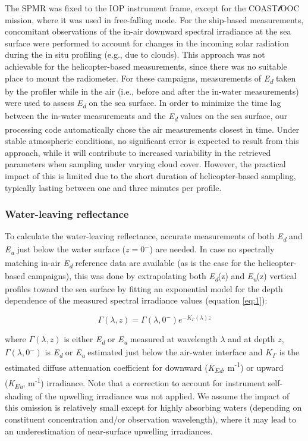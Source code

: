 \documentclass[essd, manuscript]{copernicus}
\newcommand{\coastlooc}{COAST$\mathscr{l}$OOC~\allowbreak}
\begin{document}
The SPMR was fixed to the IOP instrument frame, except for the \coastlooc 5 mission, where it was used in free-falling mode. For the ship-based measurements, concomitant observations of the in-air downward spectral irradiance at the sea surface were performed to account for changes in the incoming solar radiation during the in situ profiling (e.g., due to clouds). This approach was not achievable for the helicopter-based measurements, since there was no suitable place to mount the radiometer. For these campaigns, measurements of \textit{E\textsubscript{d}} taken by the profiler while in the air (i.e., before and after the in-water measurements) were used to assess \textit{E\textsubscript{d}} on the sea surface. In order to minimize the time lag between the in-water measurements and the \textit{E\textsubscript{d}} values on the sea surface, our processing code automatically chose the air measurements closest in time. Under stable atmospheric conditions, no significant error is expected to result from this approach, while it will contribute to increased variability in the retrieved parameters when sampling under varying cloud cover. However, the practical impact of this is limited due to the short duration of helicopter-based sampling, typically lasting between one and three minutes per profile.

\subsubsection{Water-leaving reflectance}

To calculate the water-leaving reflectance, accurate measurements of both \textit{E\textsubscript{d}} and \textit{E\textsubscript{u}} just below the water surface ($z=0^-$) are needed. In case no spectrally matching in-air \textit{E\textsubscript{d}} reference data are available (as is the case for the helicopter-based campaigns), this was done by extrapolating both \textit{E\textsubscript{d}}(z) and \textit{E\textsubscript{u}}(z) vertical profiles toward the sea surface by fitting an exponential model for the depth dependence of the measured spectral irradiance values (equation \ref{eq:1}):

\begin{equation}
    \Gamma(\lambda, z) = \Gamma(\lambda, 0^-)e^{-K_\Gamma(\lambda)z}
    \label{eq:1}
\end{equation}

where $\Gamma(\lambda, z)$ is either \textit{E\textsubscript{d}} or \textit{E\textsubscript{u}} measured at wavelength $\lambda$ and at depth $z$, $\Gamma(\lambda, 0^-)$ is \textit{E\textsubscript{d}} or \textit{E\textsubscript{u}} estimated just below the air-water interface and $K_\Gamma$ is the estimated diffuse attenuation coefficient for downward (\textit{K\textsubscript{Ed}}, m\textsuperscript{-1}) or upward (\textit{K\textsubscript{Eu}}, m\textsuperscript{-1}) irradiance. Note that a correction to account for instrument self-shading of the upwelling irradiance was not applied. We assume the impact of this omission is relatively small except for highly absorbing waters (depending on constituent concentration and/or observation wavelength), where it may lead to an underestimation of near-surface upwelling irradiances.
\end{document}
